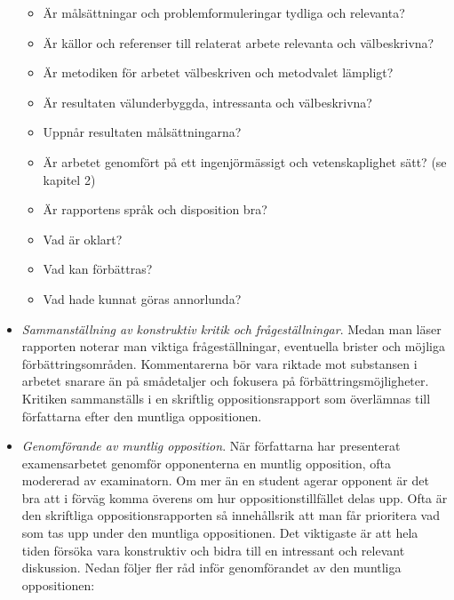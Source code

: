 \begin{itemize}
  \begin{itemize}
  \item
    Är målsättningar och problemformuleringar tydliga och relevanta?
  \item
    Är källor och referenser till relaterat arbete relevanta och
    välbeskrivna?
  \item
    Är metodiken för arbetet välbeskriven och metodvalet lämpligt?
  \item
    Är resultaten välunderbyggda, intressanta och välbeskrivna?
  \item
    Uppnår resultaten målsättningarna?
  \item
    Är arbetet genomfört på ett ingenjörmässigt och vetenskaplighet
    sätt? (se kapitel 2)
  \item
    Är rapportens språk och disposition bra?
  \item
    Vad är oklart?
  \item
    Vad kan förbättras?
  \item
    Vad hade kunnat göras annorlunda?
  \end{itemize}
\item
  \emph{Sammanställning av konstruktiv kritik och frågeställningar}.
  Medan man läser rapporten noterar man viktiga frågeställningar,
  eventuella brister och möjliga förbättringsområden. Kommentarerna bör
  vara riktade mot substansen i arbetet snarare än på smådetaljer och
  fokusera på förbättringsmöjligheter. Kritiken sammanställs i en
  skriftlig oppositionsrapport som överlämnas till författarna efter den
  muntliga oppositionen.
\item
  \emph{Genomförande av muntlig opposition}. När författarna har
  presenterat examensarbetet genomför opponenterna en muntlig
  opposition, ofta modererad av examinatorn. Om mer än en student agerar
  opponent är det bra att i förväg komma överens om hur
  oppositionstillfället delas upp. Ofta är den skriftliga
  oppositionsrapporten så innehållsrik att man får prioritera vad som
  tas upp under den muntliga oppositionen. Det viktigaste är att hela
  tiden försöka vara konstruktiv och bidra till en intressant och
  relevant diskussion. Nedan följer fler råd inför genomförandet av den
  muntliga oppositionen:


\end{itemize}
